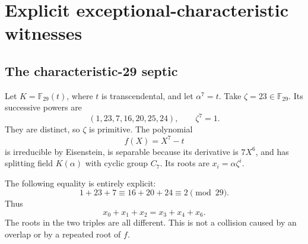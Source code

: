 \documentclass[11pt,a4paper]{article}
\theoremstyle{definition}
\theoremstyle{remark}
\newcommand{\F}{\mathbb F}
\begin{document}
\section{Explicit exceptional-characteristic witnesses}
\label{rss:sec:witnesses}

\subsection{The characteristic-29 septic}

Let $K=\F_{29}(t)$, where $t$ is transcendental, and let $\alpha^7=t$.
Take $\zeta=23\in\F_{29}$. Its successive powers are
\[
 (1,23,7,16,20,25,24),\qquad \zeta^7=1.
\]
They are distinct, so $\zeta$ is primitive. The polynomial
\[
 f(X)=X^7-t
\]
is irreducible by Eisenstein, is separable because its derivative is
$7X^6$, and has splitting field $K(\alpha)$ with cyclic group $C_7$.
Its roots are $x_i=\alpha\zeta^i$.

The following equality is entirely explicit:
\[
 1+23+7\equiv16+20+24\equiv2\pmod{29}.
\]
Thus
\begin{equation}
 x_0+x_1+x_2=x_3+x_4+x_6.
 \label{rss:eq:collision29}
\end{equation}
The roots in the two triples are all different. This is not a collision
caused by an overlap or by a repeated root of $f$.
\end{document}
